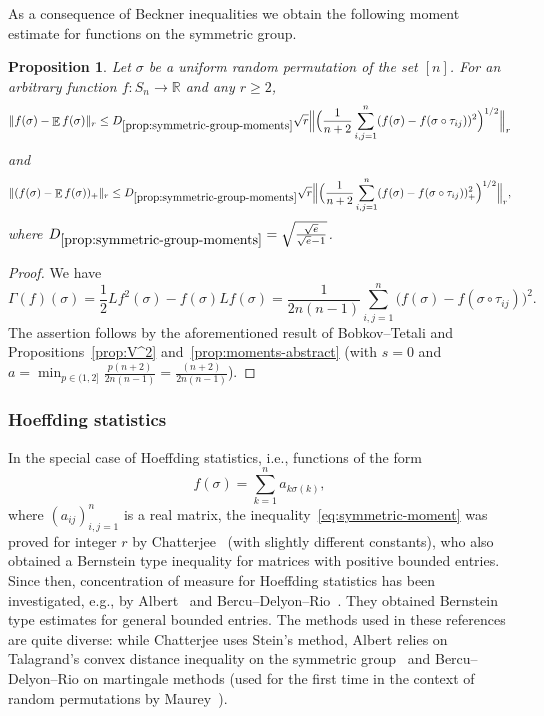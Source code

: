 \documentclass[a4paper]{amsart}
\newtheorem{proposition}[theorem]{Proposition} %
\theoremstyle{definition}
\theoremstyle{remark}
\numberwithin{equation}{section}
\newcommand*{\RR}{\mathbb{R}}
\newcommand*{\ds}{D_{\ref{prop:symmetric-group-moments}}}
\DeclareMathOperator{\EE}{\mathbb{E}} %
\begin{document}
As a consequence of Beckner inequalities we obtain the following moment estimate for functions on the symmetric group.

\begin{proposition}\label{prop:symmetric-group-moments}
Let $\sigma$ be a uniform random permutation of the set $[n]$. For an arbitrary function $f \colon S_n \to \RR$ and any $r\ge 2$,
\begin{equation}\label{eq:symmetric-moment}
  \|f(\sigma) - \EE f(\sigma)\|_r \le  \ds \sqrt{r} \Big\|\Bigl(\frac{1}{n+2}\sum_{i,j=1}^n (f(\sigma) - f(\sigma\circ \tau_{ij}))^2\Bigr)^{1/2}\Big\|_r
\end{equation}
and
\begin{equation}\label{eq:symetric-moment-+}
  \|(f(\sigma) - \EE f(\sigma))_+\|_r \le  \ds \sqrt{r} \Big\| \Bigl(\frac{1}{n+2}\sum_{i,j=1}^n (f(\sigma) - f(\sigma\circ \tau_{ij}))_+^2\Bigr)^{1/2}\Big\|_r,
\end{equation}
where $\ds = \sqrt{\frac{\sqrt{e}}{\sqrt{e}-1}}$.
\end{proposition}

\begin{proof}
 We have
 \[
  \Gamma(f)(\sigma) = \frac{1}{2} L f^2(\sigma) - f(\sigma)Lf(\sigma) = \frac{1}{2n(n-1)} \sum_{i,j=1}^n \bigl(f(\sigma) - f(\sigma\circ \tau_{ij})\bigr)^2.
 \]
 The assertion follows by the aforementioned result of Bobkov--Tetali and Propositions~\ref{prop:V^2} and~\ref{prop:moments-abstract} (with $s=0$ and $a=
 \min_{p\in(1,2]} \frac{p(n+2)}{2n(n-1)} =\frac{(n+2)}{2n(n-1)}$).
\end{proof}


\subsubsection{Hoeffding statistics}

In the special case of Hoeffding statistics, i.e., functions of the form
\begin{equation}\label{eq:Hoeffding-statistic}
f(\sigma) = \sum_{k=1}^n a_{k\sigma(k)},
\end{equation}
where $(a_{ij})_{i,j=1}^n$ is a real matrix, the inequality~\eqref{eq:symmetric-moment} was proved for integer $r$ by Chatterjee~\cite{MR2288072} (with slightly different constants), who also obtained a Bernstein type inequality for matrices with positive bounded entries. Since then, concentration of measure for Hoeffding statistics has been investigated, e.g., by Albert~\cite{mlis2018concentration} and Bercu--Delyon--Rio~\cite{MR3363542}. They obtained Bernstein type estimates for general bounded entries. The methods used in these references are quite diverse: while Chatterjee uses Stein's method, Albert relies on Talagrand's convex distance inequality on the symmetric group~\cite{MR1361756} and Bercu--Delyon--Rio on martingale methods (used for the first time in the context of random permutations by Maurey~\cite{MR533901}).
\end{document}

